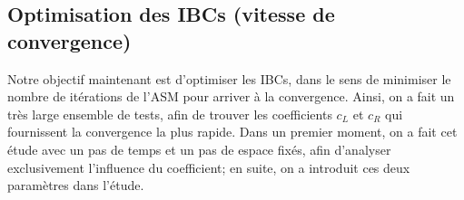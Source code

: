 %
%
%
%
%
%

\subsection{Optimisation des IBCs (vitesse de convergence)}

\indent Notre objectif maintenant est d'optimiser les IBCs, dans le sens de minimiser le nombre de itérations de l'ASM pour arriver à la convergence.   Ainsi, on a fait un très large ensemble de tests, afin de trouver les coefficients $c_L$ et $c_R$ qui fournissent la convergence la plus rapide. Dans un premier moment, on a fait cet étude avec un pas de temps et un pas de espace fixés, afin d'analyser exclusivement l'influence du coefficient; en suite, on a introduit ces deux paramètres dans l'étude.

